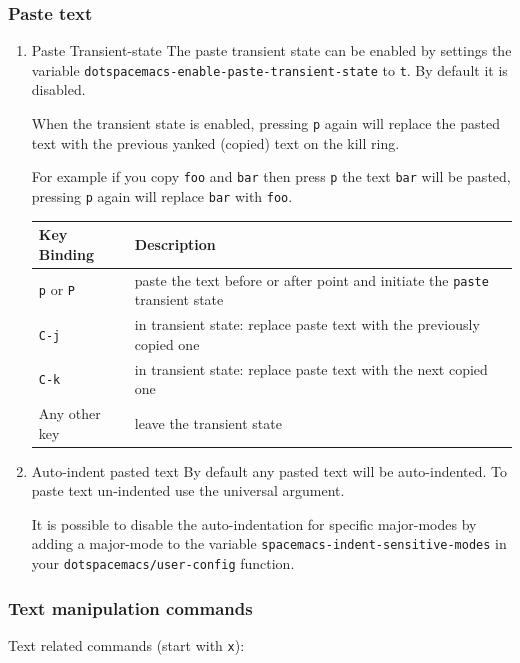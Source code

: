 \documentclass[11pt]{article}
\begin{document}
\subsubsection{Paste text}
\label{sec:org218b1ee}
\begin{enumerate}
\item Paste Transient-state
\label{sec:orgd600e6e}
The paste transient state can be enabled by settings the variable
\texttt{dotspacemacs-enable-paste-transient-state} to \texttt{t}. By default it is disabled.

When the transient state is enabled, pressing \texttt{p} again will replace the pasted text
with the previous yanked (copied) text on the kill ring.

For example if you copy \texttt{foo} and \texttt{bar} then press \texttt{p} the text \texttt{bar} will
be pasted, pressing \texttt{p} again will replace \texttt{bar} with \texttt{foo}.

\begin{center}
\begin{tabular}{ll}
Key Binding & Description\\
\hline
\texttt{p} or \texttt{P} & paste the text before or after point and initiate the \texttt{paste} transient state\\
\texttt{C-j} & in transient state: replace paste text with the previously copied one\\
\texttt{C-k} & in transient state: replace paste text with the next copied one\\
Any other key & leave the transient state\\
\end{tabular}
\end{center}

\item Auto-indent pasted text
\label{sec:org5032cae}
By default any pasted text will be auto-indented. To paste text un-indented use
the universal argument.

It is possible to disable the auto-indentation for specific major-modes by
adding a major-mode to the variable \texttt{spacemacs-indent-sensitive-modes} in your
\texttt{dotspacemacs/user-config} function.
\end{enumerate}

\subsubsection{Text manipulation commands}
\label{sec:org167b916}
Text related commands (start with \texttt{x}):
\end{document}
